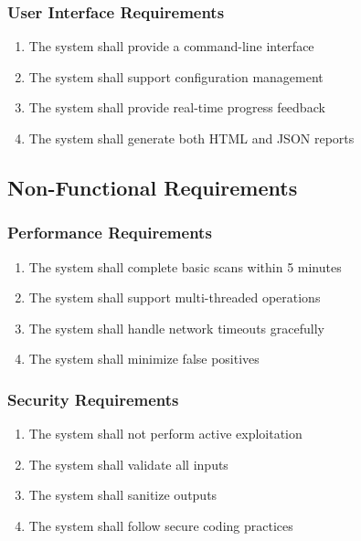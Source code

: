 \documentclass[12pt,a4paper]{report}
\begin{document}
\subsubsection{User Interface Requirements}

\begin{enumerate}
    \item The system shall provide a command-line interface
    \item The system shall support configuration management
    \item The system shall provide real-time progress feedback
    \item The system shall generate both HTML and JSON reports
\end{enumerate}

\subsection{Non-Functional Requirements}

\subsubsection{Performance Requirements}

\begin{enumerate}
    \item The system shall complete basic scans within 5 minutes
    \item The system shall support multi-threaded operations
    \item The system shall handle network timeouts gracefully
    \item The system shall minimize false positives
\end{enumerate}

\subsubsection{Security Requirements}

\begin{enumerate}
    \item The system shall not perform active exploitation
    \item The system shall validate all inputs
    \item The system shall sanitize outputs
    \item The system shall follow secure coding practices
\end{enumerate}
\end{document}
